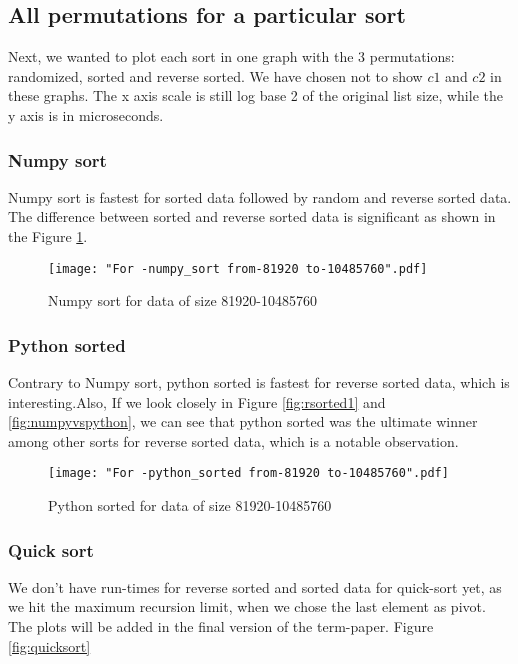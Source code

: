 \documentclass[sigconf, nonacm, natbib, screen, balance=False]{acmart}
\begin{document}
\subsection{All permutations for a particular sort }\label{allpermut}

Next, we wanted to plot each sort in one graph with the 3 permutations: randomized, sorted and reverse sorted. We have chosen not to show $c1$ and $c2$ in these graphs. The x axis scale is still log base 2 of the original list size, while the y axis is in microseconds.

\subsubsection{Numpy sort}
Numpy sort is fastest for sorted data followed by random and reverse sorted data. The difference between sorted and reverse sorted data is significant as shown in the Figure \ref{fig:numpysort}.

\begin{figure}[ht]
\texttt{[image: "For -numpy\_sort from-81920 to-10485760".pdf]}
    \caption{Numpy sort for data of size 81920-10485760 }
    \label{fig:numpysort}
\end{figure}

\subsubsection{Python sorted}
Contrary to Numpy sort, python sorted is fastest for reverse sorted data, which is interesting.Also, If we look closely in Figure \ref{fig:rsorted1} and \ref{fig:numpyvspython}, we can see that python sorted was the ultimate winner among other sorts for reverse sorted data, which is a notable observation.

\begin{figure}[ht]
\texttt{[image: "For -python\_sorted from-81920 to-10485760".pdf]}
    \caption{Python sorted for data of size 81920-10485760 }
    \label{fig:pythonsorted}
\end{figure}

\subsubsection{Quick sort}
We don't have run-times for reverse sorted and sorted data for quick-sort yet, as we hit the maximum recursion limit, when we chose the last element as pivot. The plots will be added in the final version of the term-paper. Figure \ref{fig:quicksort}
\end{document}
